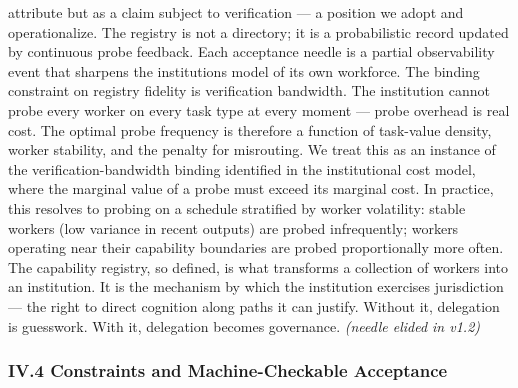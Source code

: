 \documentclass[
]{article}
\begin{document}
attribute but as a claim subject to verification --- a position we adopt
and operationalize. The registry is not a directory; it is a
probabilistic record updated by continuous probe feedback. Each
acceptance needle is a partial observability event that sharpens the
institution\textquotesingle s model of its own workforce. The binding
constraint on registry fidelity is verification bandwidth. The
institution cannot probe every worker on every task type at every moment
--- probe overhead is real cost. The optimal probe frequency is
therefore a function of task-value density, worker stability, and the
penalty for misrouting. We treat this as an instance of the
verification-bandwidth binding identified in the institutional cost
model, where the marginal value of a probe must exceed its marginal
cost. In practice, this resolves to probing on a schedule stratified by
worker volatility: stable workers (low variance in recent outputs) are
probed infrequently; workers operating near their capability boundaries
are probed proportionally more often. The capability registry, so
defined, is what transforms a collection of workers into an institution.
It is the mechanism by which the institution exercises jurisdiction ---
the right to direct cognition along paths it can justify. Without it,
delegation is guesswork. With it, delegation becomes governance.
\emph{(needle elided in v1.2)}

\subsubsection{IV.4 Constraints and Machine-Checkable
Acceptance}\label{iv4-constraints-and-machine-checkable-acceptance}
\end{document}
